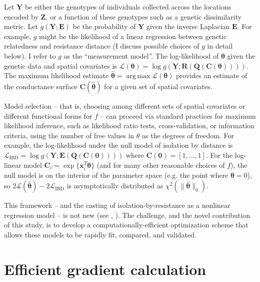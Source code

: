 \documentclass[11pt]{article}
\DeclareMathOperator*{\argmax}{arg\,max}
\newcommand{\mat}[1]{\mathbf{#1}}
\begin{document}
Let $\mat Y$ be either the genotypes of individuals collected across the
locations encoded by $\mat Z$, or a function of these genotypes such as a
genetic dissimilarity metric. Let $g(\mat Y; \mat E)$ be the probability of
$\mat Y$ given the inverse Laplacian $\mat E$. For example, $g$ might be the
likelihood of a linear regression between genetic relatedness and resistance
distance (I discuss possible choices of $g$ in detail below). I refer to $g$ as
the ``measurement model''. The log-likelihood of $\bm \theta$ given the genetic
data and spatial covariates is $\mathcal{L}(\bm \theta) = \log g(\mat Y; \mat
R(\mat Q(\mat C(\bm \theta))))$.  The maximum likelihood estimate $\hat{\bm
  \theta} = \argmax \mathcal{L}(\bm \theta)$ provides an estimate of the
conductance surface $\mat C(\hat{\bm \theta})$ for a given set of spatial
covariates. 

Model selection -- that is, choosing among different sets of spatial covariates
or different functional forms for $f$ -- can proceed via standard practices for
maximum likelihood inference, such as likelihood ratio tests, cross-validation,
or information criteria, using the number of free values in $\theta$ as the
degrees of freedom. For example, the log-likelihood under the null model of
isolation by distance is $\mathcal{L}_{\mathrm{IBD}} = \log g(\mat Y; \mat
E(\mat Q(\mat C(\mat 0))))$ where $\mat C(\mat 0) = [1, \dots, 1]$. For the
log-linear model $\mat C_i = \exp \{ \mat x_i^T \bm \theta \}$ (and for many other
reasonable choices of $f$), the null model is on the interior of the parameter
space (e.g. the point where $\bm \theta = 0$), so $2 \mathcal{L} (\hat{\bm \theta}) -
2 \mathcal{L}_\mathrm{IBD}$ is asymptotically distributed as 
$\chi^2(\| \bm{\hat \theta} \|_0)$.

This framework -- and the casting of isolation-by-resistance as a nonlinear regression model --
is not new (see \cite{peterson}, \cite{peterman}). The challenge, and the novel contribution of this study,
is to develop a computationally-efficient optimization scheme that allows these models to be rapidly fit, compared, and
validated.


\section{Efficient gradient calculation}
\end{document}
